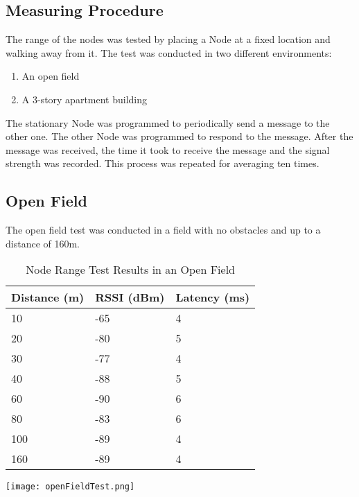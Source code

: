     \subsection{Measuring Procedure}
    The range of the nodes was tested by placing a Node at a fixed location
    and walking away from it. 
    The test was conducted in two different environments:
    \begin{enumerate}
        \item An open field
        \item A 3-story apartment building
    \end{enumerate}

    The stationary Node was programmed to periodically send a
    message to the other one. The other Node was programmed to
    respond to the message. After the message was received,
    the time it took to receive the message and the 
    signal strength was recorded. 
    This process was repeated for averaging ten times.

    \subsection{Open Field}
    The open field test was conducted in a field with no obstacles
    and up to a distance of 160m.
    \vspace{1cm}

    \begin{table}[h!]
        \centering
        \begin{minipage}{0.40\textwidth} %
            \centering
            \begin{tabular}{|p{2cm}|p{1.6cm}|p{1.6cm}|}
                \hline
                \textbf{Distance (m)} & \textbf{RSSI (dBm)} & \textbf{Latency (ms)} \\ \hline
                10  & -65 & 4 \\ \hline
                20  & -80 & 5 \\ \hline
                30  & -77 & 4 \\ \hline
                40  & -88 & 5 \\ \hline
                60  & -90 & 6 \\ \hline
                80  & -83 & 6 \\ \hline
                100 & -89 & 4 \\ \hline
                160 & -89 & 4 \\ \hline
            \end{tabular}
            \label{tab:node_range_test}
        \end{minipage}%
        \hfill %
        \begin{minipage}{0.55\textwidth} %
            \centering
            \texttt{[image: openFieldTest.png]}
            \label{fig:node_range_test}
        \end{minipage}
        \caption{Node Range Test Results in an Open Field}
    \end{table}

